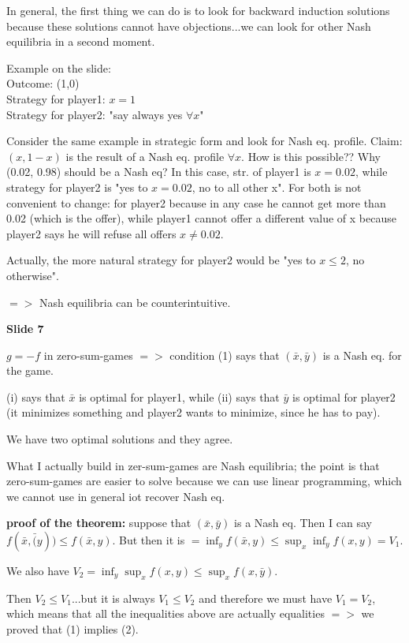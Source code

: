 \documentclass[pt11,a4paper,twoside,reqno,openright]{paper}
\begin{document}
\noindent In general, the first thing we can do is to look for backward 
induction solutions because these solutions cannot have objections...we 
can look for other Nash equilibria in a second moment.

\noindent Example on the slide:\\
Outcome: (1,0)\\
Strategy for player1: $x=1$\\
Strategy for player2: "say always yes $\forall x$"

\noindent Consider the same example in strategic form and look for Nash 
eq. profile. Claim: $(x,1-x)$ is the result of a Nash eq. profile 
$\forall x$. How is this possible?? Why (0.02, 0.98) should be a Nash eq? 
In this case, str. of player1 is $x=0.02$, while strategy for player2 is 
"yes to $x=0.02$, no to all other x". For both is not convenient to change: 
for player2 because in any case he cannot get more than 0.02 (which is 
the offer), while player1 cannot offer a different value of x because 
player2 says he will refuse all offers $x\neq 0.02$.

\noindent Actually, the more natural strategy for player2 would be 
"yes to $x \leq 2$, no otherwise".

\noindent $=>$ Nash equilibria can be counterintuitive.

\bigskip
\noindent \textbf{Slide 7}

\noindent $g=-f$ in zero-sum-games $=>$ condition (1) says that 
$(\bar{x},\bar{y})$ is a Nash eq. for the game.

\noindent (i) says that $\bar{x}$ is optimal for player1, while (ii) says 
that $\bar{y}$ is optimal for player2 (it minimizes something and 
player2 wants to minimize, since he has to pay).

\noindent We have two optimal solutions and they agree.

\noindent What I actually build in zer-sum-games are Nash equilibria; 
the point is that zero-sum-games are easier to solve because we can use 
linear programming, which we cannot use in general iot recover Nash eq.

\noindent \textbf{proof of the theorem:} suppose that $(\bar{x},\bar{y})$ 
is a Nash eq. Then I can say $f(\bar{x},\bar(y)) \leq f(\bar{x},y)$. But 
then it is $ = \inf_y{f(\bar{x},y) \leq \sup_x{\inf_y{f(x,y)}}} = V_1$.

\noindent We also have $V_2 = \inf_y{\sup_x{f(x,y)}} \leq 
\sup_x{f(x,\bar{y})}$.

\noindent Then $V_2 \leq V_1$...but it is always $V_1 \leq V_2$ and 
therefore we must have $V_1 = V_2$, which means that all the inequalities 
above are actually equalities $=>$ we proved that (1) implies (2).
\end{document}
